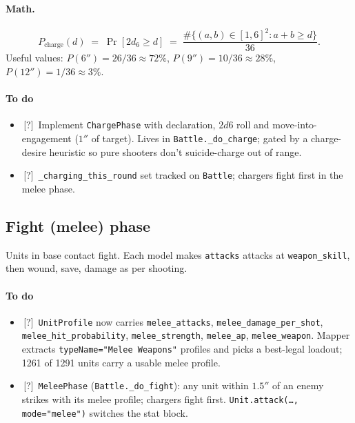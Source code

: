 \documentclass[11pt,a4paper]{article}
\newcommand{\either}{\textcolor{eithergrey}{\textsf{[?]}}}
\newcommand{\done}{\ding{51}\,}     %
\begin{document}
\paragraph{Math.}
\[
  P_{\text{charge}}(d) \;=\; \Pr[2d_6 \geq d]
  \;=\; \frac{\#\{(a,b) \in [1,6]^2 : a+b \geq d\}}{36}.
\]
Useful values: $P(6'') = 26/36 \approx 72\%$,
$P(9'') = 10/36 \approx 28\%$, $P(12'') = 1/36 \approx 3\%$.

\paragraph{To do}
\begin{itemize}[label={},leftmargin=*,itemsep=2pt]
  \item \done \either\ Implement \texttt{ChargePhase} with declaration,
    $2d6$ roll and move-into-engagement ($1''$ of target). Lives in
    \texttt{Battle.\_do\_charge}; gated by a charge-desire heuristic
    so pure shooters don't suicide-charge out of range.
  \item \done \either\ \texttt{\_charging\_this\_round} set tracked on
    \texttt{Battle}; chargers fight first in the melee phase.
\end{itemize}

\subsection{Fight (melee) phase}
Units in base contact fight. Each model makes \texttt{attacks} attacks
at \texttt{weapon\_skill}, then wound, save, damage as per shooting.

\paragraph{To do}
\begin{itemize}[label={},leftmargin=*,itemsep=2pt]
  \item \done \either\ \texttt{UnitProfile} now carries
    \texttt{melee\_attacks}, \texttt{melee\_damage\_per\_shot},
    \texttt{melee\_hit\_probability}, \texttt{melee\_strength},
    \texttt{melee\_ap}, \texttt{melee\_weapon}. Mapper extracts
    \texttt{typeName="Melee Weapons"} profiles and picks a best-legal
    loadout; 1261 of 1291 units carry a usable melee profile.
  \item \done \either\ \texttt{MeleePhase} (\texttt{Battle.\_do\_fight}):
    any unit within $1.5''$ of an enemy strikes with its melee profile;
    chargers fight first. \texttt{Unit.attack(\dots,\, mode="melee")}
    switches the stat block.
\end{itemize}
\end{document}
